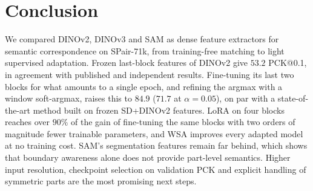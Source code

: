 \section{Conclusion}
\label{sec:conclusion}

We compared DINOv2, DINOv3 and SAM as dense feature extractors for semantic correspondence on SPair-71k, from training-free matching to light supervised adaptation. Frozen last-block features of DINOv2 give $53.2$ PCK@0.1, in agreement with published and independent results. Fine-tuning its last two blocks for what amounts to a single epoch, and refining the argmax with a window soft-argmax, raises this to $84.9$ ($71.7$ at $\alpha{=}0.05$), on par with a state-of-the-art method built on frozen SD+DINOv2 features. LoRA on four blocks reaches over $90\%$ of the gain of fine-tuning the same blocks with two orders of magnitude fewer trainable parameters, and WSA improves every adapted model at no training cost. SAM's segmentation features remain far behind, which shows that boundary awareness alone does not provide part-level semantics. Higher input resolution, checkpoint selection on validation PCK and explicit handling of symmetric parts are the most promising next steps.
